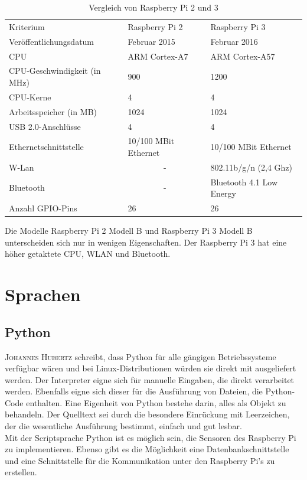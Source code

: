 \begin{table}[h]
\centering
\caption{Vergleich von Raspberry Pi 2 und 3 \cite{CortexA7} \cite{CortexA57}}
\label{tab:VergleichRaspberry}
\begin{tabular}{lll}
Kriterium                    & Raspberry Pi 2        					& Raspberry Pi 3           \\
Veröffentlichungsdatum       & Februar 2015          					& Februar 2016             \\
CPU                          & ARM Cortex-A7   & ARM Cortex-A57           \\
CPU-Geschwindigkeit (in MHz) & 900             & 1200                     \\
CPU-Kerne                    & 4                              & 4                        \\
Arbeitsspeicher (in MB)      & 1024                  					& 1024                     \\
USB 2.0-Anschlüsse           & 4                     					& 4                        \\
Ethernetschnittstelle        & 10/100 MBit Ethernet  					& 10/100 MBit Ethernet     \\
W-Lan                        & \multicolumn{1}{c}{-} 					& 802.11b/g/n (2,4 Ghz)    \\
Bluetooth                    & \multicolumn{1}{c}{-} 					& Bluetooth 4.1 Low Energy \\
Anzahl GPIO-Pins             & 26                    					& 26                      
\end{tabular}
\end{table}
 
Die Modelle Raspberry Pi 2 Modell B und Raspberry Pi 3 Modell B unterscheiden sich nur in wenigen Eigenschaften. Der Raspberry Pi 3 hat eine höher getaktete CPU, WLAN und Bluetooth.

\section{Sprachen}

\subsection{Python}\label{Python}
\textsc{Johannes Hubertz}\cite{hubertz2016softwaretests} schreibt, dass Python für alle gängigen Betriebssysteme verfügbar wären und bei Linux-Distributionen würden sie direkt mit ausgeliefert werden. Der Interpreter eigne sich für manuelle Eingaben, die direkt verarbeitet werden. Ebenfalls eigne sich dieser für die Ausführung von Dateien, die Python-Code enthalten. Eine Eigenheit von Python bestehe darin, alles als Objekt zu behandeln. Der Quelltext sei durch die besondere Einrückung mit Leerzeichen, der die wesentliche Ausführung bestimmt, einfach und gut lesbar. \\
Mit der Scriptsprache Python ist es möglich sein, die Sensoren des Raspberry Pi zu implementieren. Ebenso gibt es die Möglichkeit eine Datenbankschnittstelle und eine Schnittstelle für die Kommunikation unter den Raspberry Pi's zu erstellen.

